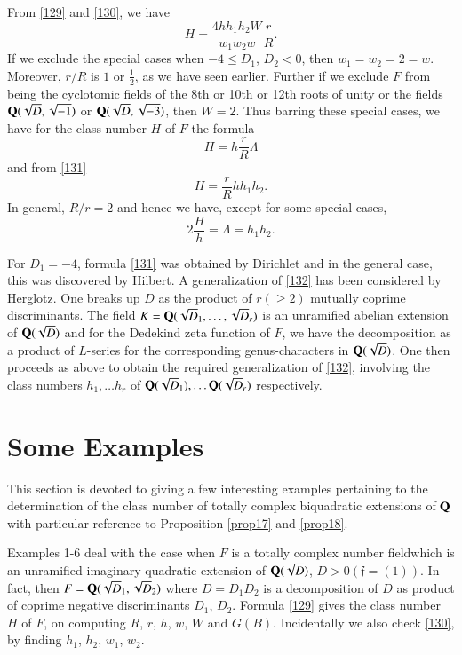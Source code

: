 From \eqref{129} and \eqref{130}, we have
\begin{equation*}
H=\frac{4hh_{1}h_{2}W}{w_{1}w_{2}w}\frac{r}{R}.\tag{131}\label{131}
\end{equation*}\pageoriginale
If we exclude the special cases when $-4\leq D_{1}$, $D_{2}<0$, then
$w_{1}=w_{2}=2=w$. Moreover, $r/R$ is $1$ or $\frac{1}{2}$, as we have
seen earlier. Further if we exclude $F$ from being the cyclotomic
fields of the 8th or 10th or 12th roots of unity or the fields
$\mathbf{Q}(\sqrt{D},\sqrt{-1})$ or $\mathbf{Q}(\sqrt{D},\sqrt{-3})$, then
$W=2$. Thus barring these special cases, we have for the class number
$H$ of $F$ the formula
$$
H=h\frac{r}{R}\Lambda
$$
and from \eqref{131}
\begin{equation*}
H=\frac{r}{R}hh_{1}h_{2}.\tag{132}\label{132}
\end{equation*}
In general, $R/r=2$ and hence we have, except for some special cases,
$$
2\frac{H}{h}=\Lambda=h_{1}h_{2}.
$$

For $D_{1}=-4$, formula \eqref{131} was obtained by Dirichlet and in
the general case, this was discovered by Hilbert. A generalization of
\eqref{132} has been considered by Herglotz. One breaks up $D$ as the
product of $r(\geq 2)$ mutually coprime discriminants. The field
$K=\mathbf{Q}(\sqrt{D}_{1},\ldots,\sqrt{D}_{r})$ is an unramified abelian
extension of $\mathbf{Q}(\sqrt{D})$ and for the Dedekind zeta function of
$F$, we have the decomposition as a product of $L$-series for the
corresponding genus-characters in $\mathbf{Q}(\sqrt{D})$. One then proceeds
as above to obtain the required generalization of \eqref{132},
involving the class numbers $h_{1},\ldots h_{r}$ of
$\mathbf{Q}(\sqrt{D}_{1}),\ldots \mathbf{Q}(\sqrt{D}_{r})$ respectively.

\section{Some Examples}\label{chap2:sec6}

This section is devoted to giving a few interesting examples
pertaining to the determination of the class number of totally complex
biquadratic extensions of $\mathbf{Q}$ with particular reference to
Proposition \ref{prop17} and \ref{prop18}.

Examples 1-6 deal with the case when $F$ is a totally complex number
field\pageoriginale which is an unramified imaginary quadratic
extension of $\mathbf{Q}(\sqrt{D})$, $D>0(\mathfrak{f}=(1))$. In fact, then
$F=\mathbf{Q}(\sqrt{D}_{1},\sqrt{D}_{2})$ where $D=D_{1}D_{2}$ is a
decomposition of $D$ as product of coprime negative discriminants
$D_{1}$, $D_{2}$. Formula \eqref{129} gives the class number $H$ of
$F$, on computing $R$, $r$, $h$, $w$, $W$ and $G(B)$. Incidentally we
also check \eqref{130}, by finding $h_{1}$, $h_{2}$, $w_{1}$, $w_{2}$.

